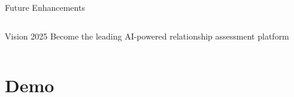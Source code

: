 \documentclass[aspectratio=169]{beamer}
\begin{document}
\begin{frame}{Future Enhancements}
\begin{columns}[T]
\begin{center}
            \vspace{0.3cm}
            \begin{alertblock}{Vision 2025}
                Become the leading AI-powered relationship assessment platform
            \end{alertblock}
        \end{center}
    \end{columns}
\end{frame}

\section{Demo}
\end{document}
